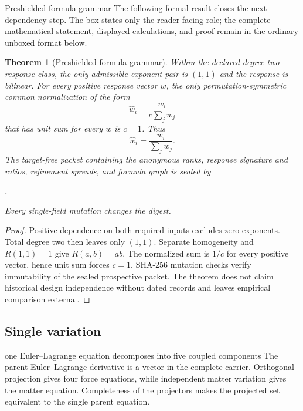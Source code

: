 \documentclass[11pt]{article}
\numberwithin{equation}{section}
\newtheorem{theorem}[definition]{Theorem}
\theoremstyle{remark}
\begin{document}
\begin{proofguide}{Preshielded formula grammar}
The following formal result closes the next dependency step. The box states only the reader-facing role; the complete mathematical statement, displayed calculations, and proof remain in the ordinary unboxed format below.
\end{proofguide}
\begin{theorem}[Preshielded formula grammar]
Within the declared degree-two response class, the only admissible exponent pair is $(1,1)$ and the response is bilinear. For every positive response vector $w$, the only permutation-symmetric common normalization of the form
\begin{equation}
\widehat w_i=\frac{w_i}{c\sum_jw_j}
\end{equation}
that has unit sum for every $w$ is $c=1$. Thus
\begin{equation}
\widehat w_i=\frac{w_i}{\sum_jw_j}.
\end{equation}
The target-free packet containing the anonymous ranks, response signature and ratios, refinement spreads, and formula graph is sealed by
\begin{center}
.
\end{center}
Every single-field mutation changes the digest.
\end{theorem}
\begin{proof}
Positive dependence on both required inputs excludes zero exponents. Total degree two then leaves only $(1,1)$. Separate homogeneity and $R(1,1)=1$ give $R(a,b)=ab$. The normalized sum is $1/c$ for every positive vector, hence unit sum forces $c=1$. SHA-256 mutation checks verify immutability of the sealed prospective packet. The theorem does not claim historical design independence without dated records and leaves empirical comparison external.
\end{proof}

\subsection{Single variation}
\begin{interpretivebridge}{one Euler--Lagrange equation decomposes into five coupled components}
The parent Euler--Lagrange derivative is a vector in the complete carrier. Orthogonal projection gives four force equations, while independent matter variation gives the matter equation. Completeness of the projectors makes the projected set equivalent to the single parent equation.
\end{interpretivebridge}
\end{document}
